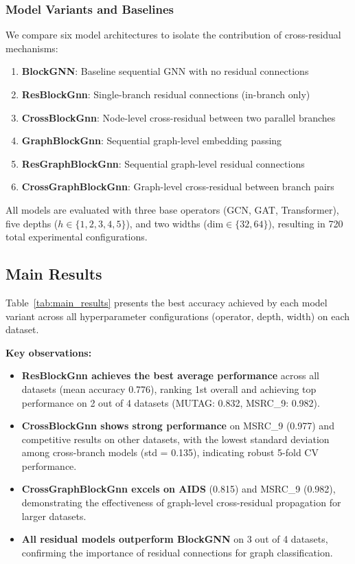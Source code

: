 \subsubsection{Model Variants and Baselines}

We compare six model architectures to isolate the contribution of cross-residual mechanisms:
\begin{enumerate}
    \item \textbf{BlockGNN}: Baseline sequential GNN with no residual connections
    \item \textbf{ResBlockGnn}: Single-branch residual connections (in-branch only)
    \item \textbf{CrossBlockGnn}: Node-level cross-residual between two parallel branches
    \item \textbf{GraphBlockGnn}: Sequential graph-level embedding passing
    \item \textbf{ResGraphBlockGnn}: Sequential graph-level residual connections
    \item \textbf{CrossGraphBlockGnn}: Graph-level cross-residual between branch pairs
\end{enumerate}

All models are evaluated with three base operators (GCN, GAT, Transformer), five depths ($h \in \{1, 2, 3, 4, 5\}$), and two widths ($\text{dim} \in \{32, 64\}$), resulting in 720 total experimental configurations.

\subsection{Main Results}

Table~\ref{tab:main_results} presents the best accuracy achieved by each model variant across all hyperparameter configurations (operator, depth, width) on each dataset.



\textbf{Key observations:}
\begin{itemize}
    \item \textbf{ResBlockGnn achieves the best average performance} across all datasets (mean accuracy 0.776), ranking 1st overall and achieving top performance on 2 out of 4 datasets (MUTAG: 0.832, MSRC\_9: 0.982).
    \item \textbf{CrossBlockGnn shows strong performance} on MSRC\_9 (0.977) and competitive results on other datasets, with the lowest standard deviation among cross-branch models (std = 0.135), indicating robust 5-fold CV performance.
    \item \textbf{CrossGraphBlockGnn excels on AIDS} (0.815) and MSRC\_9 (0.982), demonstrating the effectiveness of graph-level cross-residual propagation for larger datasets.
    \item \textbf{All residual models outperform BlockGNN} on 3 out of 4 datasets, confirming the importance of residual connections for graph classification.
\end{itemize}

